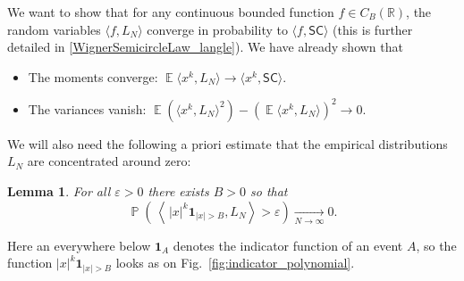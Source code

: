\documentclass[letterpaper,11pt,oneside,reqno]{amsart}
\numberwithin{equation}{section}
\newcommand{\SC}{\mathsf{SC}}
\DeclareMathOperator{\EE}{\mathbb{E}}
\DeclareMathOperator{\PP}{\mathbb{P}}
\newtheorem{lemma}[proposition]{Lemma}
\theoremstyle{definition}
\begin{document}
We want to show that for any continuous bounded function $f\in C_B(\mathbb R)$, the random
variables $\langle f, L_N\rangle$ converge in probability to 
$\langle f, \SC\rangle$ (this is further detailed in \eqref{WignerSemicircleLaw_langle}).
We have already shown that 
\begin{itemize}
	\item The moments converge: $\EE\langle x^{k}, L_N\rangle\to\langle x^k,\SC\rangle$.
	\item The variances
	vanish: 
	$\EE ( \langle x^k , L_N \rangle^2 ) - ( \EE \langle x^k , L_N \rangle )^2 \to0.$
\end{itemize}

We will also need the following a priori estimate that the empirical distributions
$L_N$ are concentrated around zero:
\begin{lemma}\label{lemma:WSCL_truncation}
	For all $ \varepsilon > 0 $ there exists $ B>0 $ so that
	\begin{equation*}
		\PP \left( \, \left \langle \, | x |^k \mathbf{1}_{ | x | > B } , L_N \right \rangle > \varepsilon \right) \xrightarrow[ N \to \infty ]{} 0.
	\end{equation*}
\end{lemma}
Here an everywhere below $\mathbf{1}_{A}$ denotes the indicator function of an event $A$, so the function $| x |^k \mathbf{1}_{ | x | > B }$ looks as on Fig.~\ref{fig:indicator_polynomial}.
\end{document}
